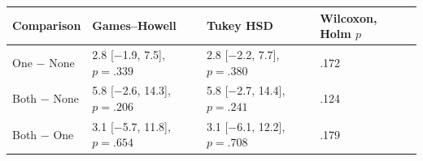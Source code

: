 \begin{tabular}{llll}
\toprule
Comparison & Games--Howell & Tukey HSD & Wilcoxon, Holm $p$ \\
\midrule
One $-$ None & 2.8 [\ensuremath{-}1.9, 7.5], $p = .339$ & 2.8 [\ensuremath{-}2.2, 7.7], $p = .380$ & .172 \\
Both $-$ None & 5.8 [\ensuremath{-}2.6, 14.3], $p = .206$ & 5.8 [\ensuremath{-}2.7, 14.4], $p = .241$ & .124 \\
Both $-$ One & 3.1 [\ensuremath{-}5.7, 11.8], $p = .654$ & 3.1 [\ensuremath{-}6.1, 12.2], $p = .708$ & .179 \\
\bottomrule
\end{tabular}

